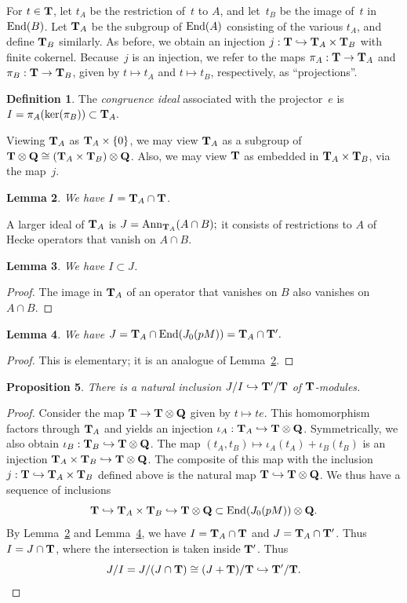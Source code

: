 \documentclass[10pt,twoside]{article}
\newcommand{\Q}{{\bf{Q}}}
\newcommand{\T}{{\bf{T}}}
\newcommand{\tensor}{\otimes}
\newcommand{\hra}{\hookrightarrow}
\newcommand{\End}{{\rm End}}
\newcommand{\isom}{\cong}
\newtheorem{lem}{Lemma}[section]
\newtheorem{prop}[lem]{Proposition}
\theoremstyle{definition}
\newtheorem{defi}[lem]{Definition}
\DeclareMathOperator{\Ann}{Ann}
\begin{document}
For $t \in \T$, let $t_A$ be the restriction of~$t$ to $A$, and
let~$t_B$ be the image of~$t$ in $\End(B)$.  Let $\T_A$ be the
subgroup of $\End(A)$ consisting of the various $t_A$, and define
$\T_B$ similarly.  As before, we obtain an injection
$
  j : \T \hra \T_A \times \T_B
$
with finite cokernel.  Because~$j$ is an injection, we
refer to the maps $\pi_A:\T\to \T_A$ and $\pi_B : \T \to \T_B$,
given by $t \mapsto t_A$ and $t\mapsto t_B$, respectively, 
as ``projections''. 

\begin{defi}
The {\em congruence ideal} associated with the projector~$e$ is 
$I=\pi_A(\ker(\pi_B)) \subset \T_A.$
\end{defi}

Viewing $\T_A$ as $\T_A\times \{0\}$, we may view $\T_A$ as a subgroup
of $\T\tensor\Q \isom (\T_A\times \T_B)\tensor\Q$.  Also, we may view
$\T$ as embedded in $\T_A\times \T_B$, via the map~$j$.
\begin{lem}\label{lem:i_int}
We have $I=\T_A\cap \T$.
\end{lem}

A larger ideal of $\T_A$ is 
$
  J = \Ann_{\T_A}(A \cap B);
$
it consists of restrictions to $A$ of Hecke operators that
vanish on $A\cap B$.  

\begin{lem}
We have $I\subset J$.
\end{lem}
\begin{proof}
The image in $\T_A$ of an operator that vanishes on $B$ also
vanishes on $A\cap B$.
\end{proof}

\begin{lem}\label{lem:j_int}
We have 
$J = \T_A \cap \End(J_0(pM)) = \T_A \cap \T'.$
\end{lem}
\begin{proof}
This is elementary; it is an analogue of Lemma~\ref{lem:i_int}.
\end{proof}

\begin{prop}\label{prop:ji_inc}
There is a natural inclusion
$
  J/I \hra \T'/\T
$
of $\T$-modules.
\end{prop}
\begin{proof}
Consider the map $\T\to \T\tensor\Q$ given by $t\mapsto te$.
This homomorphism factors through $\T_A$ and yields an injection
$\iota_A : \T_A \hra \T\tensor\Q$.  Symmetrically, we also
obtain $\iota_B : \T_B \hra \T\tensor\Q$.  The
map
$(t_A, t_B)  \mapsto \iota_A(t_A) + \iota_B(t_B)$
is an injection
 $\T_A\times \T_B \hra \T\tensor\Q$.
The composite of this map with the inclusion $j:\T\hra \T_A\times \T_B$
defined above is the natural map $\T\hra \T\tensor\Q$.  We thus have
a sequence of inclusions
$$
  \T \hra \T_A \times \T_B \hra \T\tensor \Q 
        \subset \End(J_0(pM))\tensor\Q.
$$
By Lemma~\ref{lem:i_int} and Lemma~\ref{lem:j_int},
we have $I=\T_A\cap \T$ and $J=\T_A\cap \T'$.
Thus $I=J\cap \T$, where the intersection is taken
inside $\T'$.  Thus
$$
  J/I = J/(J\cap \T) \isom (J+\T)/\T \hra \T'/\T.
$$
\end{proof}
\end{document}
